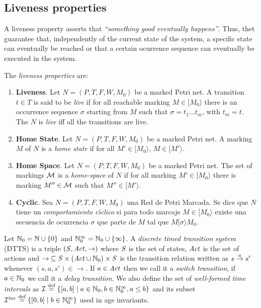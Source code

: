 
\subsection{Liveness properties}
A liveness property asserts that \emph{``something good eventually happens''}.
Thus, thet guarantee that, independently of the current state of the system,
a specific state can eventually be reached or that a certain ocurrence sequence can eventually
be executed in the system.

The \emph{liveness properties} are:
\begin{enumerate}
\item {\bf Liveness}.
Let $N=(P,T,F,W,M_0)$ be a marked Petri net. A transition $t \in T$
is said to be {\it live} if for all reachable marking $M \in
[ M_0 \rangle$ there is an occurrence sequence $\sigma$ starting from $M$ such that
$\sigma = t_1 \ldots t_m$, with $t_m = t$. The $N$ is {\it live} iff all the transitions are live.
\item {\bf Home State}.
Let $N=(P,T,F,W,M_0)$ be a marked Petri net. A marking $M$ of $N$ is a {\it home state} if for all
$M' \in [ M_0 \rangle$, $M \in [ M' \rangle$.
\item {\bf Home Space}. Let $N=(P,T,F,W,M_0)$ be a marked Petri net.
The set of markings ${\cal M}$ is a {\it home-space}
of $N$ if for all marking $M' \in [ M_0 \rangle$ there is marking
$M'' \in {\cal M}$ such that $M'' \in [ M' \rangle$.
\item {\bf Cyclic}.
Sea $N=(P,T,F,W,M_0)$ una Red de Petri Marcada. Se dice que
$N$ tiene un {\it comportamiento c\'{\i}clico} si para todo marcaje
$M \in [ M_0 \rangle$ existe una secuencia de ocurrencia $\sigma$
que parte de $M$ tal que $M [ \sigma \rangle M_0$.
\end{enumerate}


Let $\mathbb{N}_{0} = \mathbb{N} \cup \{0\}$ and 
$\mathbb{N}_{0}^{\infty} = \mathbb{N}_{0} \cup \left\{\infty \right\}$.
A \emph{discrete timed transition system} (DTTS) 
is a triple $\left(\mathit{S}, \mathit{Act},\rightarrow\right)$
where $\mathit{S}$ is the set of states, $\mathit{Act}$ is the set of actions
and $\rightarrow\: \subseteq \mathit{S} \times (\mathit{Act} \cup \mathbb{N}_{0})  \times \mathit{S}$ is the 
transition relation written as $s \stackrel{a}{\rightarrow} s'$ whenever $(s,a,s') \in \rightarrow$.
If $a \in \mathit{Act}$ then we call it a \emph{switch transition}, if
$a \in \mathbb{N}_{0}$ we call it a \emph{delay transition}.
We also define the set of \emph{well-formed time intervals} as 
$\mathcal{I} \stackrel{\textrm{def}}{=} \{[a,b] \mid a \in \mathbb{N}_{0},b\in \mathbb{N}_{0}^{\infty}, a\leq b \}$
and its subset $\mathcal{I}^{\text{inv}} \stackrel{\textrm{def}}{=} \{[0,b] \mid b\in \mathbb{N}_{0}^{\infty} \}$
used in age invariants. 

